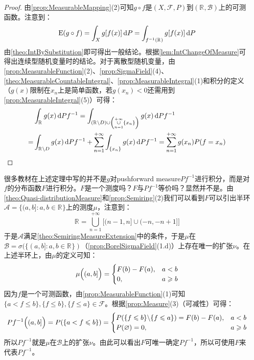 \begin{proof}
	由\cref{prop:MeasurableMapping}(2)可知$g\circ f$是$(X,\mathscr{F},P)$到$(\mathbb{R}^{},\mathcal{B})$上的可测函数。注意到：
	\begin{equation*}
		\operatorname{E}(g\circ f)=\int_{X}g[f(x)]\mathop{}\!\mathrm{d} P=\int_{f^{-1}(\mathbb{R}^{})}g[f(x)]\mathop{}\!\mathrm{d} P
	\end{equation*}
	由\cref{theo:IntBySubstitution}即可得出一般结论。根据\cref{lem:IntChangeOfMeasure}可得出连续型随机变量时的结论。对于离散型随机变量，由\cref{prop:MeasurableFunction}(2)、\cref{prop:SigmaField}(4)、\cref{theo:MeasurableCountableIntegral}、\cref{prop:MeasurableIntegral}(1)和积分的定义（$g(x)$限制在$x_n$上是简单函数，若$g(x_n)<0$还需用到\cref{prop:MeasurableIntegral}(5)）可得：
	\begin{align*}
		&\int_{\mathbb{R}^{}}g(x)\mathop{}\!\mathrm{d} Pf^{-1}=\int_{(\mathbb{R}^{}\backslash D)\cup\left(\underset{n=1}{\overset{+\infty}{\cup}}\{x_n\}\right)}g(x)\mathop{}\!\mathrm{d} Pf^{-1} \\
		=&\int_{\mathbb{R}^{}\backslash D}g(x)\mathop{}\!\mathrm{d} Pf^{-1}+\sum_{n=1}^{+\infty}\int_{\{x_n\}}g(x)\mathop{}\!\mathrm{d} Pf^{-1}=\sum_{n=1}^{+\infty}g(x_n)P(f=x_n)\qedhere
	\end{align*}
\end{proof}
\begin{note}
	很多教材在上述定理中写的并不是$g$对pushforward measure$Pf^{-1}$进行积分，而是对$f$的分布函数$F$进行积分。$F$是一个测度吗？$F$与$Pf^{-1}$等价吗？显然并不是。由\cref{theo:Quasi-distributionMeasure}和\cref{prop:Semiring}(2)我们可以看到$F$可以引出半环$\mathscr{A}=\{(a,b]:a,b\in\mathbb{R}^{}\}$上的测度$\mu$，注意到：
	\begin{equation*}
		\mathbb{R}^{}=\underset{n=1}{\overset{+\infty}{\bigcup}}\Big[(n-1,n]\cup(-n,-n+1]\Big]
	\end{equation*}
	于是$\mathscr{A}$满足\cref{theo:SemiringMeasureExtension}中的条件，于是$\mu$在$\mathcal{B}=\sigma(\{(a,b]:a,b\in\mathbb{R}^{}\})$（\cref{prop:BorelSigmaField}(1.d)）上存在唯一的扩张$\nu$。在上述半环上，由$\mu$的定义可知：
	\begin{equation*}
		\mu\Bigl((a,b]\Bigr)=
		\begin{cases}
			F(b)-F(a),&a<b \\
			0,&a\geqslant b
		\end{cases}
	\end{equation*}
	因为$f$是一个可测函数，由\cref{prop:MeasurableFunction}(1)可知$\{a<f\leqslant b\},\{f\leqslant b\},\{f\leqslant a\}\in\mathscr{F}$。根据\cref{prop:Measure}(3)（可减性）可得：
	\begin{equation*}
		Pf^{-1}\Bigl((a,b]\Bigr)=P(\{a<f\leqslant b\})=
		\begin{cases}
			P(\{f\leqslant b\}\backslash\{f\leqslant a\})=F(b)-F(a),&a<b \\
			P(\varnothing)=0,&a\geqslant b
		\end{cases}
	\end{equation*}
	所以$Pf^{-1}$就是$\mu$在$\mathcal{B}$上的扩张$\nu$。由此可以看出$F$可唯一确定$Pf^{-1}$，所以可使用$F$来代表$Pf^{-1}$。
\end{note}

